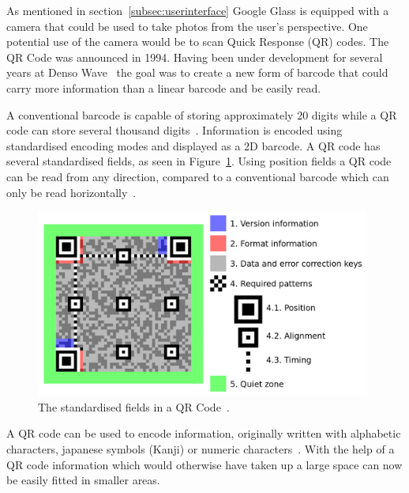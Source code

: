 As mentioned in section~\ref{subsec:userinterface} Google Glass is equipped with a camera that could be used to take photos from the user's perspective. One potential use of the camera would be to scan Quick Response (QR) codes. The QR Code was announced in 1994. Having been under development for several years at Denso Wave~\cite{qrCodeHistory} the goal was to create a new form of barcode that could carry more information than a linear barcode and be easily read.

A conventional barcode is capable of storing approximately 20 digits while a QR code can store several thousand digits~\cite{qrCodeType}. Information is encoded using standardised encoding modes and displayed as a 2D barcode. A QR code has several standardised fields, as seen in Figure~\ref{qrcodestandard}. Using position fields a QR code can be read from any direction, compared to a conventional barcode which can only be read horizontally~\cite{qrCodeAbout}.

	\begin{figure}[H]%
		\centering
		\includegraphics[width=110mm]{images/qrcodestandard}
		\caption{The standardised fields in a QR Code~\cite{qrCodeWiki}.}
		\label{qrcodestandard}
	\end{figure}
	 
A QR code can be used to encode information, originally written with alphabetic characters, japanese symbols (Kanji) or numeric characters~\cite{qrCodeVersion}. With the help of a QR code information which would otherwise have taken up a large space can now be easily fitted in smaller areas.